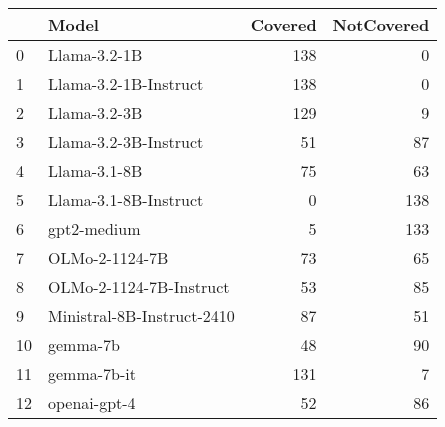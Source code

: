 \begin{tabular}{llrr}
\toprule
 & Model & Covered & NotCovered \\
\midrule
0 & Llama-3.2-1B & 138 & 0 \\
1 & Llama-3.2-1B-Instruct & 138 & 0 \\
2 & Llama-3.2-3B & 129 & 9 \\
3 & Llama-3.2-3B-Instruct & 51 & 87 \\
4 & Llama-3.1-8B & 75 & 63 \\
5 & Llama-3.1-8B-Instruct & 0 & 138 \\
6 & gpt2-medium & 5 & 133 \\
7 & OLMo-2-1124-7B & 73 & 65 \\
8 & OLMo-2-1124-7B-Instruct & 53 & 85 \\
9 & Ministral-8B-Instruct-2410 & 87 & 51 \\
10 & gemma-7b & 48 & 90 \\
11 & gemma-7b-it & 131 & 7 \\
12 & openai-gpt-4 & 52 & 86 \\
\bottomrule
\end{tabular}
